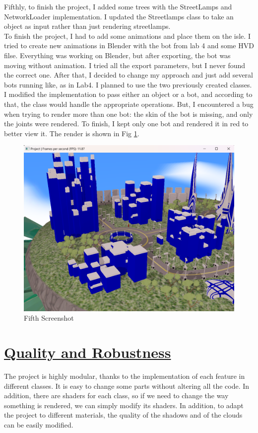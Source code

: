 \documentclass[acmtog,screen,review,nonacm]{acmart}
\begin{document}
Fifthly, to finish the project, I added some trees with the StreetLamps and NetworkLoader implementation. I updated the Streetlamps class to take an object as input rather than just rendering streetlamps. 
\\
To finish the project, I had to add some animations and place them on the isle. I tried to create new animations in Blender with the bot from lab 4 and some HVD filse. Everything was working on Blender, but after exporting, the bot was moving without animation. I tried all the export parameters, but I never found the correct one. After that, I decided to change my approach and just add several bots running like, as in Lab4. I planned to use the two previously created classes. I modified the implementation to pass either an object or a bot, and according to that, the class would handle the appropriate operations. But, I encountered a bug when trying to render more than one bot: the skin of the bot is missing, and only the joints were rendered. To finish, I kept only one bot and rendered it in red to better view it. The render is shown in Fig \ref{fig:Fig 5}.

\begin{figure}[H]
    \centering
    \includegraphics[width=0.5\linewidth]{save/Save5_25_12_2024.png}
    \caption{Fifth Screenshot}
    \label{fig:Fig 5}
\end{figure}

\section{\underline{Quality and Robustness}}
The project is highly modular, thanks to the implementation of each feature in different classes. It is easy to change some parts without altering all the code. In addition, there are shaders for each class, so if we need to change the way something is rendered, we can simply modify its shaders. In addition, to adapt the project to different materials, the quality of the shadows and of the clouds can be easily modified. 
\\
\end{document}
